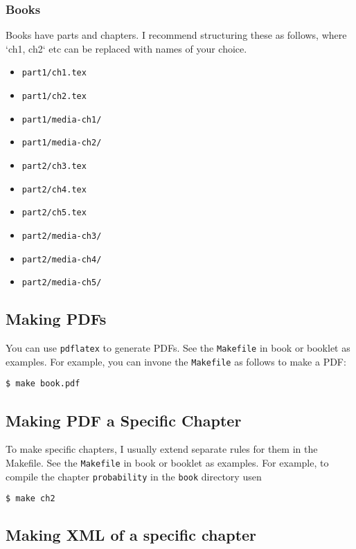 \subsubsection{Books}

Books have parts and chapters. I recommend structuring these as follows, where `ch1, ch2` etc can be replaced with names of your choice.
%
\begin{itemize}
\item \lstinline`part1/ch1.tex`
\item \lstinline`part1/ch2.tex`
\item \lstinline`part1/media-ch1/`
\item \lstinline`part1/media-ch2/`
\item \lstinline`part2/ch3.tex`
\item \lstinline`part2/ch4.tex`
\item \lstinline`part2/ch5.tex`
\item \lstinline`part2/media-ch3/`
\item \lstinline`part2/media-ch4/`
\item \lstinline`part2/media-ch5/`
\end{itemize}
   
\subsection{Making PDFs}
You can use \lstinline`pdflatex` to generate PDFs.  See the \lstinline`Makefile` in book or booklet as examples.
%
For example, you can  invone the \lstinline`Makefile` as follows to make a PDF:
\begin{lstlisting}
$ make book.pdf
\end{lstlisting}

\subsection{Making PDF a Specific Chapter}
To make specific chapters, I usually extend separate rules for them in the Makefile.  See the \lstinline`Makefile` in book or booklet as examples.
%
For example, to compile the chapter \lstinline`probability` in the \lstinline`book` directory usen
\begin{lstlisting}
$ make ch2
\end{lstlisting}

\subsection{Making XML of a specific chapter}

